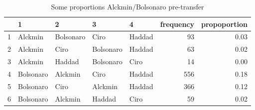 \begin{table}[!h]
  \centering
\begin{tabular}{rllllrr}
  \hline
 & 1 & 2 & 3 & 4 & frequency & propoportion \\
  \hline
  1 & Alckmin & Bolsonaro & Ciro & Haddad & 93 & 0.03 \\
  2 & Alckmin & Ciro & Bolsonaro & Haddad & 63 & 0.02 \\
  3 & Alckmin & Haddad & Bolsonaro & Ciro & 14 & 0.00 \\
  4 & Bolsonaro & Alckmin & Ciro & Haddad & 556 & 0.18 \\
  5 & Bolsonaro & Ciro & Alckmin & Haddad & 366 & 0.12 \\
  6 & Bolsonaro & Alckmin & Haddad & Ciro & 59 & 0.02 \\

   \hline
\end{tabular}
\caption{Some proportions Alckmin/Bolsonaro pre-transfer}
\label{tbl:overunderex}
\end{table}
